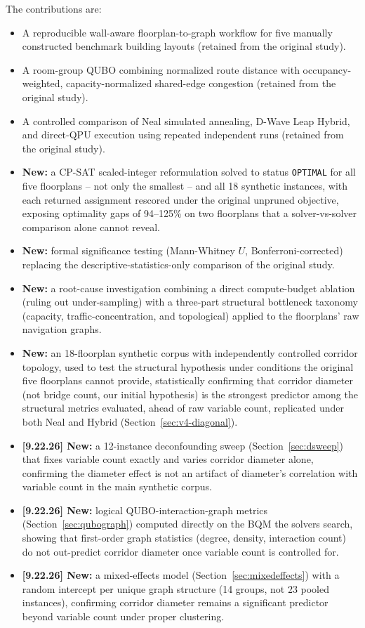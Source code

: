 \documentclass[11pt]{article}
\begin{document}
The contributions are:
\begin{itemize}[leftmargin=*]
\item A reproducible wall-aware floorplan-to-graph workflow for five manually constructed benchmark building layouts (retained from the original study).
\item A room-group QUBO combining normalized route distance with occupancy-weighted, capacity-normalized shared-edge congestion (retained from the original study).
\item A controlled comparison of Neal simulated annealing, D-Wave Leap Hybrid, and direct-QPU execution using repeated independent runs (retained from the original study).
\item \textbf{New:} a CP-SAT scaled-integer reformulation solved to status \texttt{OPTIMAL} for all five floorplans -- not only the smallest -- and all 18 synthetic instances, with each returned assignment rescored under the original unpruned objective, exposing optimality gaps of 94--125\% on two floorplans that a solver-vs-solver comparison alone cannot reveal.
\item \textbf{New:} formal significance testing (Mann-Whitney $U$, Bonferroni-corrected) replacing the descriptive-statistics-only comparison of the original study.
\item \textbf{New:} a root-cause investigation combining a direct compute-budget ablation (ruling out under-sampling) with a three-part structural bottleneck taxonomy (capacity, traffic-concentration, and topological) applied to the floorplans' raw navigation graphs.
\item \textbf{New:} an 18-floorplan synthetic corpus with independently controlled corridor topology, used to test the structural hypothesis under conditions the original five floorplans cannot provide, statistically confirming that corridor diameter (not bridge count, our initial hypothesis) is the strongest predictor among the structural metrics evaluated, ahead of raw variable count, replicated under both Neal and Hybrid (Section~\ref{sec:v4-diagonal}).
\item \textbf{[9.22.26] New:} a 12-instance deconfounding sweep (Section~\ref{sec:dsweep}) that fixes variable count exactly and varies corridor diameter alone, confirming the diameter effect is not an artifact of diameter's correlation with variable count in the main synthetic corpus.
\item \textbf{[9.22.26] New:} logical QUBO-interaction-graph metrics (Section~\ref{sec:qubograph}) computed directly on the BQM the solvers search, showing that first-order graph statistics (degree, density, interaction count) do not out-predict corridor diameter once variable count is controlled for.
\item \textbf{[9.22.26] New:} a mixed-effects model (Section~\ref{sec:mixedeffects}) with a random intercept per unique graph structure (14 groups, not 23 pooled instances), confirming corridor diameter remains a significant predictor beyond variable count under proper clustering.
\end{itemize}
\end{document}
